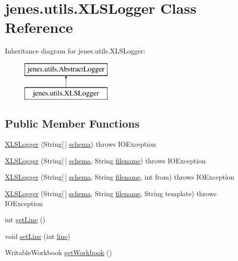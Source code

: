 \hypertarget{classjenes_1_1utils_1_1_x_l_s_logger}{\section{jenes.\-utils.\-X\-L\-S\-Logger Class Reference}
\label{classjenes_1_1utils_1_1_x_l_s_logger}
}
Inheritance diagram for jenes.\-utils.\-X\-L\-S\-Logger\-:\begin{figure}[H]
\begin{center}
\leavevmode
\includegraphics[height=2.000000cm]{classjenes_1_1utils_1_1_x_l_s_logger}
\end{center}
\end{figure}
\subsection*{Public Member Functions}
\begin{DoxyCompactItemize}
\item 
\hyperlink{classjenes_1_1utils_1_1_x_l_s_logger_a1fa625f6c332aca9178b1c7a4eb963d8}{X\-L\-S\-Logger} (String\mbox{[}$\,$\mbox{]} \hyperlink{classjenes_1_1utils_1_1_abstract_logger_a3a2030876857a0512fae7e0ad400c570}{schema})  throws I\-O\-Exception 
\item 
\hyperlink{classjenes_1_1utils_1_1_x_l_s_logger_a256b5ddf3beaa1eedb2290b52bb1a845}{X\-L\-S\-Logger} (String\mbox{[}$\,$\mbox{]} \hyperlink{classjenes_1_1utils_1_1_abstract_logger_a3a2030876857a0512fae7e0ad400c570}{schema}, String \hyperlink{classjenes_1_1utils_1_1_x_l_s_logger_a326448294f3d41ccfa5b80f496c7580e}{filename})  throws I\-O\-Exception 
\item 
\hyperlink{classjenes_1_1utils_1_1_x_l_s_logger_ac43b3385840e86a2ad4acd5040e8326b}{X\-L\-S\-Logger} (String\mbox{[}$\,$\mbox{]} \hyperlink{classjenes_1_1utils_1_1_abstract_logger_a3a2030876857a0512fae7e0ad400c570}{schema}, String \hyperlink{classjenes_1_1utils_1_1_x_l_s_logger_a326448294f3d41ccfa5b80f496c7580e}{filename}, int from)  throws I\-O\-Exception 
\item 
\hyperlink{classjenes_1_1utils_1_1_x_l_s_logger_a2e438a48213dd4e1773c380d7f9d7e4b}{X\-L\-S\-Logger} (String\mbox{[}$\,$\mbox{]} \hyperlink{classjenes_1_1utils_1_1_abstract_logger_a3a2030876857a0512fae7e0ad400c570}{schema}, String \hyperlink{classjenes_1_1utils_1_1_x_l_s_logger_a326448294f3d41ccfa5b80f496c7580e}{filename}, String template)  throws I\-O\-Exception 
\item 
int \hyperlink{classjenes_1_1utils_1_1_x_l_s_logger_a60e8ee28d3d3305e085726026e09cfdc}{get\-Line} ()
\item 
void \hyperlink{classjenes_1_1utils_1_1_x_l_s_logger_a2f9ce5372263fadce99a863149f3cb55}{set\-Line} (int \hyperlink{classjenes_1_1utils_1_1_x_l_s_logger_a2a9f48e370b1db8e0b978181bb7c5fec}{line})
\item 
Writable\-Workbook \hyperlink{classjenes_1_1utils_1_1_x_l_s_logger_ab84e4c5e6518902f710cd3c3cc337f3d}{get\-Workbook} ()
\end{DoxyCompactItemize}
